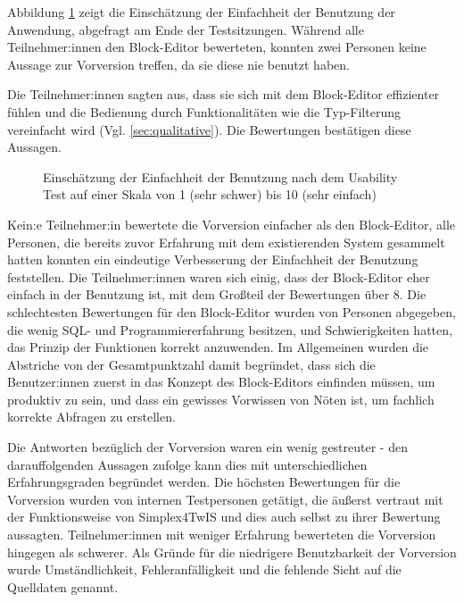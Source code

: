 Abbildung \ref{fig:ges} zeigt die Einschätzung der Einfachheit der Benutzung der Anwendung, abgefragt am Ende der Testsitzungen. Während alle Teilnehmer:innen den Block-Editor bewerteten, konnten zwei Personen keine Aussage zur Vorversion treffen, da sie diese nie benutzt haben.

Die Teilnehmer:innen sagten aus, dass sie sich mit dem Block-Editor effizienter fühlen und die Bedienung durch Funktionalitäten wie die Typ-Filterung vereinfacht wird (Vgl. \ref{sec:qualitative}). Die Bewertungen bestätigen diese Aussagen.

\begin{figure}[!ht]
  \datatable
  \centering
  \caption{Einschätzung der Einfachheit der Benutzung nach dem Usability
    Test auf einer Skala von 1 (sehr schwer) bis 10 (sehr einfach)}
  \label{fig:ges}
\end{figure}

Kein:e Teilnehmer:in bewertete die Vorversion einfacher als den Block-Editor, alle Personen, die bereits zuvor Erfahrung mit dem existierenden System gesammelt hatten konnten ein eindeutige Verbesserung der Einfachheit der Benutzung feststellen. Die Teilnehmer:innen waren sich einig, dass der Block-Editor eher einfach in der Benutzung ist, mit dem Großteil der Bewertungen über 8. Die schlechtesten Bewertungen für den Block-Editor wurden von Personen abgegeben, die wenig \ac{SQL}- und Programmiererfahrung besitzen, und Schwierigkeiten hatten, das Prinzip der Funktionen korrekt anzuwenden. Im Allgemeinen wurden die Abstriche von der Gesamtpunktzahl damit begründet, dass sich die Benutzer:innen zuerst in das Konzept des Block-Editors einfinden müssen, um produktiv zu sein, und dass ein gewisses Vorwissen von Nöten ist, um fachlich korrekte Abfragen zu erstellen.

Die Antworten bezüglich der Vorversion waren ein wenig gestreuter - den darauffolgenden Aussagen zufolge kann dies mit unterschiedlichen Erfahrungsgraden begründet werden. Die höchsten Bewertungen für die Vorversion wurden von internen Testpersonen getätigt, die äußerst vertraut mit der Funktionsweise von Simplex4TwIS und dies auch selbst zu ihrer Bewertung aussagten. Teilnehmer:innen mit weniger Erfahrung bewerteten die Vorversion hingegen als schwerer. Als Gründe für die niedrigere Benutzbarkeit der Vorversion wurde Umständlichkeit, Fehleranfälligkeit und die fehlende Sicht auf die Quelldaten genannt.
